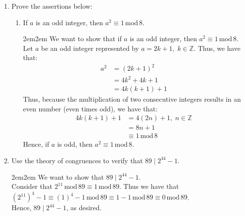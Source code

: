 \documentclass[10pt,oneside]{book}
\newcommand{\Z}{\mathbb{Z}}\newcommand{\R}{\mathbb{R}}\newcommand{\N}{\mathbb{N}}
\newcommand{\gspc}{\vspace{0.13cm}} %
\newcommand{\gline}{\gspc\\} %
\newcommand{\gmod}{\,\text{mod}\,}
\let\endoldproof\endproof
\renewenvironment{proof}[1][\proofname]
  {\vspace{0.2cm}\begin{adjustwidth}{2em}{2em}
   \oldproof[#1]}
  {\endoldproof
\end{adjustwidth}}
\begin{document}
\begin{enumerate}
\begin{enumerate}
\begin{align*}
			&\equiv 0 \gmod 13
		\end{align*}
		Thus the statement is true. 
	\end{enumerate}
	\item [8.] Prove the assertions below:
	\begin{enumerate}
		\item If $a$ is an odd integer, then $a^2\equiv 1\gmod 8$.
		\begin{proof}
			We want to show that if $a$ is an odd integer, then $a^2\equiv 1\gmod 8$. \gline
			Let $a$ be an odd integer represented by $a = 2k+1,\;k\in\Z$. Thus, we have that:
			\begin{align*}
				a^2 &= (2k+1)^2\\
				&= 4k^2 + 4k + 1\\
				&= 4k(k+1) + 1
			\end{align*}
			Thus, because the multiplication of two consecutive integers results in an even number (even times odd), we have that:
			\begin{align*}
				4k(k+1) + 1 &= 4(2n) + 1, \;n\in\Z\\
				&= 8n + 1\\
				&\equiv 1 \gmod 8
			\end{align*}
			Hence, if $a$ is odd, then $a^2 \equiv 1 \gmod 8$. 
		\end{proof}
	\end{enumerate}
	\item [16.] Use the theory of congruences to verify that $89\mid 2^{44} - 1$. 
	\begin{proof}
		We want to show that $89\mid 2^{44} - 1$. \gline
		Consider that $2^{11}\gmod 89 \equiv 1\gmod 89$. Thus we have that $(2^{11})^4 - 1 \equiv (1)^4 - 1\gmod 89 \equiv 1 - 1 \gmod 89 \equiv 0 \gmod 89$.\gline
		Hence, $89\mid 2^{44}-1$, as desired. 
	\end{proof}
\end{enumerate}
\end{document}
